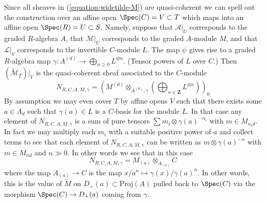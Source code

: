 \medskip\noindent
Since all sheaves in (\ref{equation-widetilde-M}) are quasi-coherent
we can spell out the construction
over an affine open $\Spec(C) = V \subset T$
which maps into an affine open $\Spec(R) = U \subset S$.
Namely, suppose that $\mathcal{A}|_U$ corresponds
to the graded $R$-algebra $A$, that $\mathcal{M}|_U$ corresponds to the
graded $A$-module $M$, and that $\mathcal{L}|_V$ corresponds to the
invertible $C$-module $L$. The map $\psi$ gives
rise to a graded $R$-algebra map
$\gamma : A^{(d)} \to \bigoplus_{n \geq 0} L^{\otimes n}$.
(Tensor powers of $L$ over $C$.)
Then $(\widetilde{\mathcal{M}}_T)|_V$
is the quasi-coherent sheaf associated to the $C$-module
$$
N_{R, C, A, M, \gamma} =
\left(
M^{(d)} \otimes_{A^{(d)}, \gamma}
\left(\bigoplus\nolimits_{n \in \mathbf{Z}} L^{\otimes n}\right)
\right)_0
$$
By assumption we may even cover $T$ by affine opens
$V$ such that there exists some $a \in A_d$ such that
$\gamma(a) \in L$ is a $C$-basis for the module $L$.
In that case any element of $N_{R, C, A, M, \gamma}$ is a sum
of pure tensors $\sum m_i \otimes \gamma(a)^{-n_i}$ with $m \in M_{n_id}$.
In fact we may multiply each $m_i$ with a suitable positive power
of $a$ and collect terms to see that each element of $N_{R, C, A, M, \gamma}$
can be written as $m \otimes \gamma(a)^{-n}$ with $m \in M_{nd}$ and
$n \gg 0$. In other words we see that in this case
$$
N_{R, C, A, M, \gamma} = M_{(a)} \otimes_{A_{(a)}} C
$$
where the map $A_{(a)} \to C$ is the map
$x/a^n \mapsto \gamma(x)/\gamma(a)^n$. In other words, this is
the value of $\widetilde{M}$ on $D_{+}(a) \subset \text{Proj}(A)$
pulled back to $\Spec(C)$ via the morphism
$\Spec(C) \to D_{+}(a)$ coming from $\gamma$.

